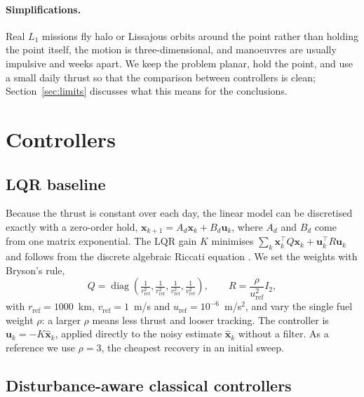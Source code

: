 \documentclass[11pt,a4paper]{article}
\begin{document}
\paragraph{Simplifications.}
Real $L_1$ missions fly halo or Lissajous orbits around the point rather than
holding the point itself, the motion is three-dimensional, and manoeuvres are
usually impulsive and weeks apart. We keep the problem planar, hold the point,
and use a small daily thrust so that the comparison between controllers is
clean; Section~\ref{sec:limits} discusses what this means for the conclusions.

\section{Controllers}

\subsection{LQR baseline}

Because the thrust is constant over each day, the linear model can be
discretised exactly with a zero-order hold, $\mathbf{x}_{k+1} = A_d \mathbf{x}_k
+ B_d \mathbf{u}_k$, where $A_d$ and $B_d$ come from one matrix exponential.
The LQR gain $K$ minimises $\sum_k \mathbf{x}_k^\top Q \mathbf{x}_k +
\mathbf{u}_k^\top R \mathbf{u}_k$ and follows from the discrete algebraic
Riccati equation \cite{bryson1975}. We set the weights with Bryson's rule,
\begin{equation}
Q = \operatorname{diag}\!\left(\tfrac{1}{r_\text{ref}^2}, \tfrac{1}{r_\text{ref}^2},
\tfrac{1}{v_\text{ref}^2}, \tfrac{1}{v_\text{ref}^2}\right), \qquad
R = \frac{\rho}{u_\text{ref}^2} I_2,
\end{equation}
with $r_\text{ref} = 1000$~km, $v_\text{ref} = 1$~m/s and $u_\text{ref} =
10^{-6}$~m/s$^2$, and vary the single fuel weight $\rho$: a larger $\rho$ means
less thrust and looser tracking. The controller is $\mathbf{u}_k = -K
\hat{\mathbf{x}}_k$, applied directly to the noisy estimate $\hat{\mathbf{x}}_k$
without a filter. As a reference we use $\rho = 3$, the cheapest recovery in an
initial sweep.

\subsection{Disturbance-aware classical controllers}
\label{sec:lqi}
\end{document}
